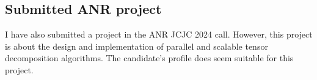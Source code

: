 \documentclass[11pt]{article}
\begin{document}
\subsection*{Submitted ANR project }
I have also submitted a project in the ANR JCJC 2024 call. However, this project is about the design and implementation  of parallel and scalable tensor decomposition algorithms. The candidate's profile does seem suitable for this project.
{
\small


}
\end{document}
